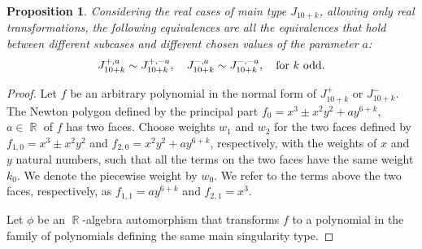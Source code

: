 \documentclass[noend]{amsproc}
\newtheorem{prop}[theorem]{Proposition}
\theoremstyle{definition}
\DeclareMathOperator{\R}{\mathbb{R}}
\begin{document}
\begin{prop}
Considering the real cases of main type $J_{10+k}$, allowing only real transformations, the following equivalences are all the equivalences that hold between different subcases and different chosen values of the parameter $a$:
\[J_{10+k}^{+,a}\sim J_{10+k}^{+,-a},\quad J_{10+k}^{-,a}\sim J_{10+k}^{-,-a},\quad \textnormal{for $k$ odd}.\]
\end{prop}

\begin{proof}
Let $f$ be an arbitrary polynomial in the normal form of $J_{10+k}^+$ or $J_{10+k}^-$. 
The Newton polygon defined by the principal part $f_0=x^3\pm x^2y^2+ay^{6+k}$, $a\in\R$ of $f$ has two faces. Choose weights $w_1$ and $w_2$ for the two faces defined by $f_{1,0}=x^3\pm x^2y^2$ and $f_{2,0}=x^2y^2+ay^{6+k}$, respectively, with the weights of $x$ and $y$ natural numbers, such that all the terms on the two faces have the same weight $k_0$. We denote the piecewise weight by $w_0$. We refer to the terms above the two faces, respectively, as $f_{1,1}=ay^{6+k}$ and $f_{2,1}=x^3$.

Let $\phi$ be an $\R$-algebra automorphism that transforms $f$ to a polynomial in the family of polynomials defining the same main singularity type.


\end{proof}
\end{document}
